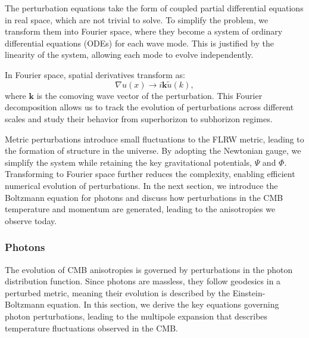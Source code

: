 \documentclass{aa}
\begin{document}
The perturbation equations take the form of coupled partial differential equations in real space, which are not trivial to solve. To simplify the problem, we transform them into Fourier space, where they become a system of ordinary differential equations (ODEs) for each wave mode. This is justified by the linearity of the system, allowing each mode to evolve independently.  

In Fourier space, spatial derivatives transform as:  
\begin{equation}
\nabla u(x) \rightarrow i \mathbf{k} \tilde{u}(k),
\end{equation}
where $\mathbf{k}$ is the comoving wave vector of the perturbation. This Fourier decomposition allows us to track the evolution of perturbations across different scales and study their behavior from superhorizon to subhorizon regimes.

Metric perturbations introduce small fluctuations to the FLRW metric, leading to the formation of structure in the universe. By adopting the Newtonian gauge, we simplify the system while retaining the key gravitational potentials, $\Psi$ and $\Phi$. Transforming to Fourier space further reduces the complexity, enabling efficient numerical evolution of perturbations. In the next section, we introduce the Boltzmann equation for photons and discuss how perturbations in the CMB temperature and momentum are generated, leading to the anisotropies we observe today.
\color{black}






\subsubsection{Photons}
\color{Plum}
The evolution of CMB anisotropies is governed by perturbations in the photon distribution function. Since photons are massless, they follow geodesics in a perturbed metric, meaning their evolution is described by the Einstein-Boltzmann equation. In this section, we derive the key equations governing photon perturbations, leading to the multipole expansion that describes temperature fluctuations observed in the CMB.  
\end{document}
